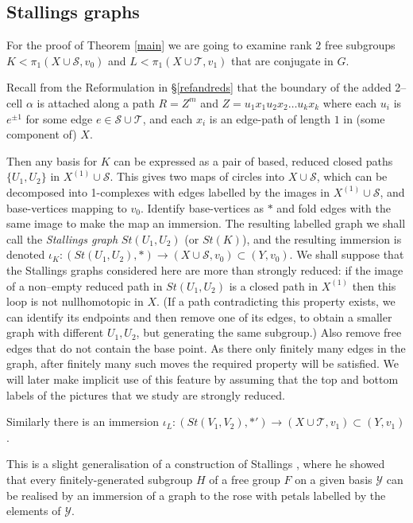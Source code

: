 \documentclass[12pt,a4paper]{amsart}
\def\cS{\mathcal{S}}
\def\cT{\mathcal{T}}
\begin{document}
\subsection{Stallings graphs} 
For the proof of Theorem \ref{main} 
we are going to examine rank $2$ 
free subgroups $K<\pi_1(X\cup\cS,v_0)$ and $L<\pi_1(X\cup\cT,v_1)$ that are conjugate in $G$.

Recall from the Reformulation in \S \ref{refandreds} 
 that the boundary of the added 2--cell $\alpha$ is attached along  a path 
$R=Z^m$ and $Z=u_1x_1u_2x_2\dots u_kx_k$ where each $u_i$ is $e^{\pm1}$ for some edge $e\in\cS\cup\cT$, 
and each $x_i$ is an edge-path   of length  $1$ in (some component of) $X$.


Then any basis for $K$ can be expressed as a pair of based, reduced closed paths   $\{U_1,U_2\}$ in ${X}^{(1)}\cup\cS$. This gives two maps of circles into $X\cup\cS$, which can be decomposed into
1-complexes with edges labelled by  the images in $X^{(1)}\cup \cS$, and base-vertices mapping to $v_0$.
Identify base-vertices as $*$ and fold edges with the same image to make the map an immersion.
The resulting labelled graph we shall call the {\em Stallings graph} $St(U_1,U_2)$ (or $St(K)$), and the resulting immersion is denoted $\iota_K:(St(U_1,U_2),*) \to (X\cup\cS,v_0) \subset (Y,v_0)$.
We shall suppose that the Stallings graphs considered here are more than strongly reduced: 
if the image of a   non--empty reduced path  in $St(U_1,U_2)$   is a closed path in $X^{(1)}$ 
then this loop is not nullhomotopic in $X$.  
(If  a path contradicting this property exists, we can identify its endpoints and then remove one of its edges, 
to obtain a smaller graph with different $U_1, U_2$, but generating the same subgroup.) 
Also remove free edges that do not contain the base point.
As there only finitely many edges in the graph, after finitely many such moves the required property will be satisfied.
We will later make implicit use of this feature by assuming that the top and bottom labels of the pictures that we study are strongly reduced.

Similarly there is an immersion $\iota_L:(St(V_1,V_2),*') \to (X\cup\cT,v_1)\subset (Y,v_1)$.

This is  a slight generalisation of a construction of Stallings \cite{St},
where he showed 
that every finitely-generated subgroup $H$ of a free group $F$
on a given basis $\mathcal{Y}$
can be realised by an immersion of a graph to the rose with petals labelled by the elements of 
$\mathcal{Y}$.  
\end{document}
